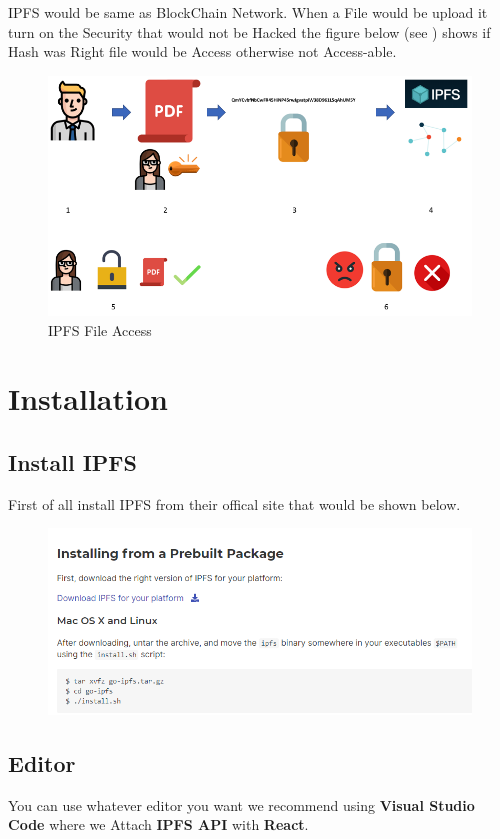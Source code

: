 IPFS would be same as BlockChain Network. When a File would be upload it turn on the Security that would not be Hacked the figure below (see ) shows if Hash was Right file would be Access otherwise not Access-able. 
\begin{figure}[h]
	\centering
	\includegraphics[width=450px]{figures/IPFS/12.png}
	\caption{IPFS File Access}
	\label{fig:ipfs3}
\end{figure}


\section{Installation}
\subsection{Install IPFS}
First of all install IPFS from their offical site that would be shown below.

\begin{figure}[h]
	\centering
	\includegraphics[width=450px]{figures/IPFS/01.png}
\end{figure}

\subsection{Editor}
You can use whatever editor you want we recommend using \textbf{Visual Studio Code} where we Attach \textbf{IPFS API} with \textbf{React}.
\newpage

